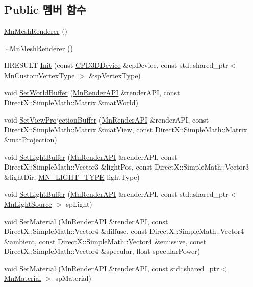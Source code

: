 \subsection*{Public 멤버 함수}
\begin{DoxyCompactItemize}
\item 
\hyperlink{class_m_n_l_1_1_mn_mesh_renderer_ab18361a6295007bc68075501ebe12c0a}{Mn\+Mesh\+Renderer} ()
\item 
\hyperlink{class_m_n_l_1_1_mn_mesh_renderer_a35c4902d777cb5e41c7f12eaf54b83f7}{$\sim$\+Mn\+Mesh\+Renderer} ()
\item 
H\+R\+E\+S\+U\+LT \hyperlink{class_m_n_l_1_1_mn_mesh_renderer_ab2f41c8498de2a4470ebbc1adc7e8987}{Init} (const \hyperlink{namespace_m_n_l_a1eec210db8f309a4a9ac0d9658784c31}{C\+P\+D3\+D\+Device} \&cp\+Device, const std\+::shared\+\_\+ptr$<$ \hyperlink{class_m_n_l_1_1_mn_custom_vertex_type}{Mn\+Custom\+Vertex\+Type} $>$ \&sp\+Vertex\+Type)
\item 
void \hyperlink{class_m_n_l_1_1_mn_mesh_renderer_afe78f898609c98523fa7cb1efa52c68f}{Set\+World\+Buffer} (\hyperlink{class_m_n_l_1_1_mn_render_a_p_i}{Mn\+Render\+A\+PI} \&render\+A\+PI, const Direct\+X\+::\+Simple\+Math\+::\+Matrix \&mat\+World)
\item 
void \hyperlink{class_m_n_l_1_1_mn_mesh_renderer_abc60188e28b29f0354aa2ed5ba17fc82}{Set\+View\+Projection\+Buffer} (\hyperlink{class_m_n_l_1_1_mn_render_a_p_i}{Mn\+Render\+A\+PI} \&render\+A\+PI, const Direct\+X\+::\+Simple\+Math\+::\+Matrix \&mat\+View, const Direct\+X\+::\+Simple\+Math\+::\+Matrix \&mat\+Projection)
\item 
void \hyperlink{class_m_n_l_1_1_mn_mesh_renderer_a0c83bc2682917b4504794b510574e320}{Set\+Light\+Buffer} (\hyperlink{class_m_n_l_1_1_mn_render_a_p_i}{Mn\+Render\+A\+PI} \&render\+A\+PI, const Direct\+X\+::\+Simple\+Math\+::\+Vector3 \&light\+Pos, const Direct\+X\+::\+Simple\+Math\+::\+Vector3 \&light\+Dir, \hyperlink{namespace_m_n_l_aac0b78de8bb8c872cb617ede813c113d}{M\+N\+\_\+\+L\+I\+G\+H\+T\+\_\+\+T\+Y\+PE} light\+Type)
\item 
void \hyperlink{class_m_n_l_1_1_mn_mesh_renderer_ad6faf4decf759e6da4ecefa1234aa36e}{Set\+Light\+Buffer} (\hyperlink{class_m_n_l_1_1_mn_render_a_p_i}{Mn\+Render\+A\+PI} \&render\+A\+PI, const std\+::shared\+\_\+ptr$<$ \hyperlink{class_m_n_l_1_1_mn_light_source}{Mn\+Light\+Source} $>$ sp\+Light)
\item 
void \hyperlink{class_m_n_l_1_1_mn_mesh_renderer_ab7ba671fa8776fcd1b8b0de20d7b2f13}{Set\+Material} (\hyperlink{class_m_n_l_1_1_mn_render_a_p_i}{Mn\+Render\+A\+PI} \&render\+A\+PI, const Direct\+X\+::\+Simple\+Math\+::\+Vector4 \&diffuse, const Direct\+X\+::\+Simple\+Math\+::\+Vector4 \&ambient, const Direct\+X\+::\+Simple\+Math\+::\+Vector4 \&emissive, const Direct\+X\+::\+Simple\+Math\+::\+Vector4 \&specular, float specular\+Power)
\item 
void \hyperlink{class_m_n_l_1_1_mn_mesh_renderer_a436b493676e8a9fbc93486a46f6fc58f}{Set\+Material} (\hyperlink{class_m_n_l_1_1_mn_render_a_p_i}{Mn\+Render\+A\+PI} \&render\+A\+PI, const std\+::shared\+\_\+ptr$<$ \hyperlink{class_m_n_l_1_1_mn_material}{Mn\+Material} $>$ sp\+Material)
\end{DoxyCompactItemize}
